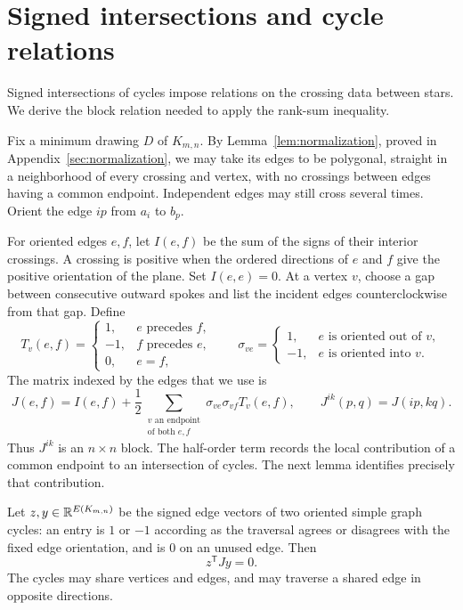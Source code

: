\section{Signed intersections and cycle relations}
\label{sec:intersections}

Signed intersections of cycles impose relations on the crossing data
between stars. We derive the block relation needed to apply the
rank-sum inequality.

Fix a minimum drawing $D$ of $K_{m,n}$.  By
Lemma~\ref{lem:normalization}, proved in Appendix~\ref{sec:normalization},
we may take its edges to be polygonal, straight in a neighborhood of
every crossing and vertex, with no crossings between edges having a
common endpoint.  Independent edges may still cross several times.
Orient the edge $ip$ from $a_i$ to $b_p$.

For oriented edges $e,f$, let $I(e,f)$ be the sum of the signs of their
interior crossings.  A crossing is positive when the ordered directions
of $e$ and $f$ give the positive orientation of the plane.  Set
$I(e,e)=0$.
At a vertex $v$, choose a gap between consecutive outward spokes and list
the incident edges counterclockwise from that gap.  Define
\[
 T_v(e,f)=
 \begin{cases}
  1,&e\text{ precedes }f,\\
  -1,&f\text{ precedes }e,\\
  0,&e=f,
 \end{cases}
 \qquad
 \sigma_{ve}=
 \begin{cases}
  1,&e\text{ is oriented out of }v,\\
  -1,&e\text{ is oriented into }v.
 \end{cases}
\]
The matrix indexed by the edges that we use is
\begin{equation}
 \label{eq:signed-J}
 J(e,f)=I(e,f)+\frac12
 \sum_{\substack{v\text{ an endpoint}\\\text{of both }e,f}}
 \sigma_{ve}\sigma_{vf}T_v(e,f),
 \qquad J^{ik}(p,q)=J(ip,kq).
\end{equation}
Thus $J^{ik}$ is an $n\times n$ block.  The half-order term records the
local contribution of a common endpoint to an intersection of cycles.
The next lemma identifies precisely that contribution.

\begin{lemma}
\label{lem:cycle-pairing}
Let $z,y\in\mathbb R^{E(K_{m,n})}$ be the signed edge vectors of two oriented
simple graph cycles: an entry is $1$ or $-1$ according as the traversal
agrees or disagrees with the fixed edge orientation, and is $0$ on an
unused edge.  Then
\begin{equation}
 \label{eq:cycle-pairing}
 z^{\mathsf T}Jy=0.
\end{equation}
The cycles may share vertices and edges, and may traverse a shared edge
in opposite directions.
\end{lemma}

